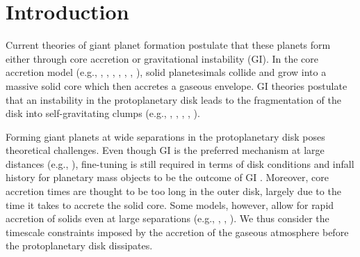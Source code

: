\documentclass[apj]{emulateapj}
\begin{document}
\section{Introduction}
\label{intro}

Current theories of giant planet formation postulate that these planets form either through core accretion or gravitational instability (GI). In the core accretion model (e.g., \citealt{harris78}, \citealt{mizuno78}, \citealt{stevenson82}, \citealt{boden86}, \citealt{wuchterl93}, \citealt{pollack96}, \citealt{dangelo11}), solid planetesimals collide and grow into a massive solid core which then accretes a gaseous envelope. GI theories postulate that an instability in the protoplanetary disk leads to the fragmentation of the disk into self-gravitating clumps (e.g., \citealt{harris78}, \citealt{boss97}, \citealt{rafikov05}, \citealt{kratter10}, \citealt{dangelo11}).  %


Forming giant planets at wide separations in the protoplanetary disk poses theoretical challenges. Even though GI is the preferred mechanism at large distances (e.g., \citealt{rafikov05}), fine-tuning is still required in terms of disk conditions and infall history for planetary mass objects to be the outcome of GI \citep{kratter10}. Moreover, core accretion times are thought to be too long in the outer disk, largely due to the time it takes to accrete the solid core. Some models, however, allow for rapid accretion of solids even at large separations (e.g., \citealt{dones93}, \citealt{kenyon09}, \citealt{lambrechts12}). We thus consider the timescale constraints imposed by the accretion of the gaseous atmosphere before the protoplanetary disk dissipates.

\end{document}
